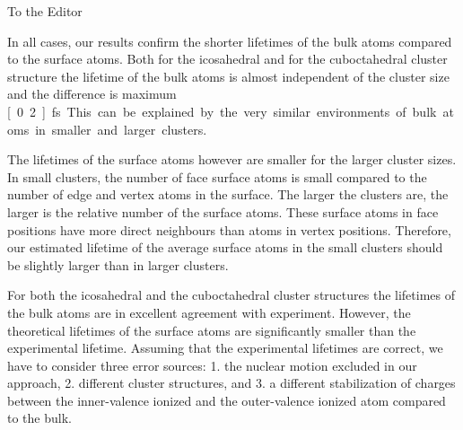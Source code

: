 \documentclass[DIN,pagenumber=false,parskip=half,fromalign=left,fromphone=true,fromemail=true,fromurl=false,fromlogo=false,fromrule=false]{scrlttr2}
\begin{document}
\begin{letter}{To the Editor}
\begin{enumerate}
{{%

In all cases, our results confirm the shorter lifetimes of the bulk atoms compared
to the surface atoms. Both for the icosahedral and for the cuboctahedral cluster
structure the lifetime of the bulk atoms is almost independent of the cluster size
and the difference is maximum \unit[0.2]{fs}. This can be explained by the very
similar environments of bulk atoms in smaller and larger clusters.}}
The lifetimes of the surface atoms however are smaller for the larger cluster sizes.
In small clusters, the number of face surface atoms is small compared to the
number of edge and vertex atoms in the surface. The larger the clusters are,
the larger is the relative number of the surface atoms. These surface atoms
in face positions have more direct neighbours than atoms in vertex positions.
Therefore, our estimated lifetime of the average surface atoms in the small       
clusters should be slightly larger than in larger clusters.

For both the icosahedral and the cuboctahedral cluster structures the lifetimes
of the bulk atoms are in excellent agreement with experiment.
However, the theoretical lifetimes of the surface atoms are significantly
smaller than the experimental lifetime. Assuming that the
experimental lifetimes are correct, we have to consider three error sources:      
1. the nuclear motion excluded in our approach, 2. different cluster structures,  
and 3. a different stabilization of charges between the             
inner-valence ionized and the outer-valence ionized atom compared to the bulk.    
                                                                    

\end{enumerate}
\end{letter}
\end{document}

